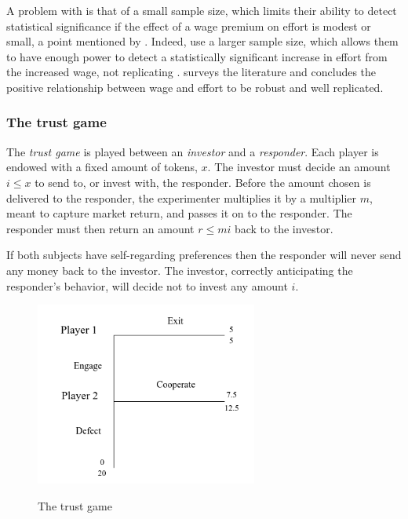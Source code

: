 \documentclass[12pt]{article}
\begin{document}
A problem with \cite{Gneezy2006} is that of a small sample size, which limits their ability to detect statistical significance if the effect of a wage premium on effort is modest or small, a point mentioned by \cite{Fehr2009}. Indeed, \cite{cohn2008fairness} use a larger sample size, which allows them to have enough power to detect a statistically significant increase in effort from the increased wage, not replicating \cite{Gneezy2006}. \cite{Fehr2009} surveys the literature and concludes the positive relationship between wage and effort to be robust and well replicated. 



\subsubsection{The trust game}


The \textit{trust game} is played between an \textit{investor} and a \textit{responder}. Each player is endowed with a fixed amount of tokens, $x$. The investor must decide an amount $i \leq x$ to send to, or invest with, the responder. Before the amount chosen is delivered to the responder, the experimenter multiplies it by a multiplier $m$, meant to capture market return, and passes it on to the responder. The responder must then return an amount $r \leq mi$ back to the investor. 

If both subjects have self-regarding preferences then the responder will never send any money back to the investor. The investor, correctly anticipating the responder's behavior, will decide not to invest any amount $i$.
\\

\begin{figure}[H]
    \centering
    \caption{The trust game}
    \includegraphics[width=0.65\textwidth]{trustgame.png}
    \label{fig:trustgame}
\end{figure}
\end{document}
